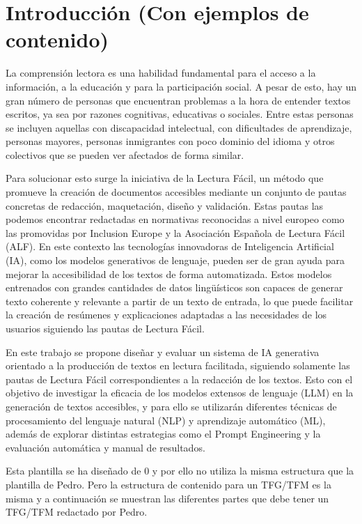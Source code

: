 
\chapter{Introducción (Con ejemplos de contenido)}

\par La comprensión lectora es una habilidad fundamental para el acceso a la información, a la educación y para la participación social. 
A pesar de esto, hay un gran número de personas que encuentran problemas a la hora de entender textos escritos, ya sea por razones cognitivas, educativas o sociales.
Entre estas personas se incluyen aquellas con discapacidad intelectual, con dificultades de aprendizaje, personas mayores, personas inmigrantes con poco dominio del idioma 
y otros colectivos que se pueden ver afectados de forma similar.
\\
\par Para solucionar esto surge la iniciativa de la Lectura Fácil, un método que promueve la creación de documentos accesibles mediante un 
conjunto de pautas concretas de redacción, maquetación, diseño y validación. Estas pautas las podemos encontrar redactadas en normativas reconocidas 
a nivel europeo como las promovidas por Inclusion Europe y la Asociación Española de Lectura Fácil (ALF).
En este contexto las tecnologías innovadoras de Inteligencia Artificial (IA), como los modelos generativos de lenguaje, pueden ser de gran ayuda para
mejorar la accesibilidad de los textos de forma automatizada. Estos modelos entrenados con grandes cantidades de datos lingüísticos son capaces de generar texto coherente 
y relevante a partir de un texto de entrada, lo que puede facilitar la creación de resúmenes y explicaciones adaptadas a las necesidades de los usuarios siguiendo las pautas de Lectura Fácil.
\\
\par En este trabajo se propone diseñar y evaluar un sistema de IA generativa orientado a la producción de textos en lectura facilitada, siguiendo solamente las pautas de Lectura Fácil 
correspondientes a la redacción de los textos. Esto con el objetivo de investigar la eficacia de los modelos extensos de lenguaje (LLM) en la generación de textos accesibles, y para ello 
se utilizarán diferentes técnicas de procesamiento del lenguaje natural (NLP) y aprendizaje automático (ML), además de explorar distintas estrategias como el Prompt Engineering y la evaluación automática y manual de resultados.
\\
\par Esta plantilla se ha diseñado de 0 y por ello no utiliza la misma estructura que la plantilla de Pedro. Pero la estructura de contenido para un TFG/TFM es la misma y a continuación se muestran las diferentes partes que debe tener un TFG/TFM redactado por Pedro.
